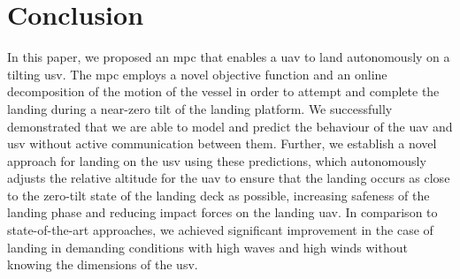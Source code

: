 \documentclass[letterpaper, 10 pt, journal, twoside]{IEEEtran}
\begin{document}
\section{Conclusion}

In this paper, we proposed an \ac{mpc} that enables a \ac{uav} to land autonomously on a tilting \ac{usv}. The \ac{mpc} employs a novel objective function and an online decomposition of the motion of the vessel in order to attempt and complete the landing during a near-zero tilt of the landing platform. We successfully demonstrated that we are able to model and predict the behaviour of the \ac{uav} and \ac{usv} without active communication between them. Further, we establish a novel approach for landing on the \ac{usv} using these predictions, which autonomously adjusts the relative altitude for the \ac{uav} to ensure that the landing occurs as close to the zero-tilt state of the landing deck as possible, increasing safeness of the landing phase and reducing impact forces on the landing \ac{uav}. In comparison to state-of-the-art approaches, we achieved significant improvement in the case of landing in demanding conditions with high waves and high winds without knowing the dimensions of the \ac{usv}.



\end{document}
